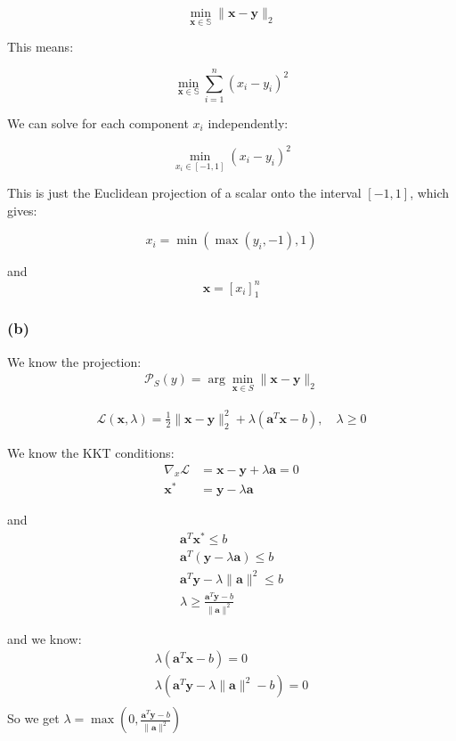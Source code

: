 \documentclass[12pt]{article}
\begin{document}
\[\min_{\bm{x}\in\mathbb{S}} \|\bm{x}-\bm{y}\|_2\]

\noindent
This means:

\[\min_{\bm{x} \in \mathbb{S}} \sum_{i=1}^n (x_i - y_i)^2\]

\noindent
We can solve for each component $x_i$ independently:

\[\min_{x_i \in [-1,1]} (x_i - y_i)^2\]

\noindent
This is just the Euclidean projection of a scalar onto the interval $[-1,1]$, which gives:

\[x_i = \min(\max(y_i, -1), 1)\]

\noindent
and \[\bm{x} = [x_i]_{1}^{n}\]

\subsubsection{(b)}

We know the projection:
\begin{align*}
    \mathcal{P}_S(y) = \arg\min_{\bm{x} \in S} \|\bm{x} - \bm{y}\|_2 
\end{align*}

\begin{align*}
    \mathcal{L}(\bm{x}, \lambda) = \frac{1}{2} \|\bm{x} - \bm{y}\|_2^2 + \lambda (\bm{a}^T \bm{x} - b), \quad \lambda \geq 0
\end{align*}

We know the KKT conditions:
\begin{align*}
    \nabla_x \mathcal{L} &= \bm{x} - \bm{y} + \lambda \bm{a} = 0 \\
    \bm{x}^* &= \bm{y} - \lambda \bm{a}
\end{align*}

and
\begin{align*}
    \bm{a}^T \bm{x}^* \leq b \\
    \bm{a}^T (\bm{y} - \lambda \bm{a}) \leq b \\
    \bm{a}^T \bm{y} - \lambda \|\bm{a}\|^2 \leq b \\
    \lambda \geq \frac{\bm{a}^T\bm{y} -b}{\|\bm{a}\|^2}
\end{align*}

and we know:
\begin{align*}
    \lambda(\bm{a}^T\bm{x} - b) = 0 \\
    \lambda(\bm{a}^T\bm{y} - \lambda\|\bm{a}\|^2 - b) = 0 \\
\end{align*}
So we get \(\lambda = \max(0, \frac{\bm{a}^T\bm{y} - b}{\|\bm{a}\|^2})\)
\end{document}
